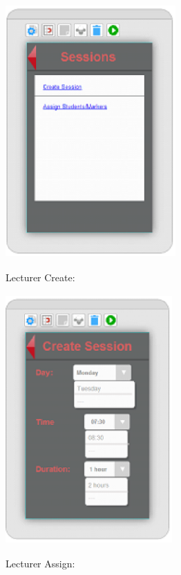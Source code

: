 \documentclass{article}
\begin{document}
\noindent       \includegraphics*[width=2.56in, height=3.82in, keepaspectratio=false]{image30}

\noindent 

Lecturer Create:

\includegraphics*[width=2.51in, height=3.74in, keepaspectratio=false]{image31}







Lecturer Assign:
\end{document}
